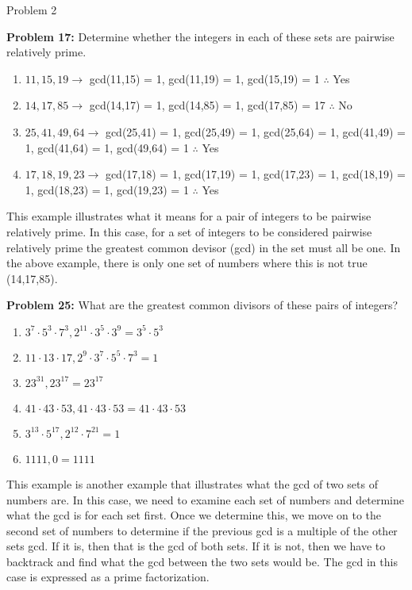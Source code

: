 \begin{problem}{Problem 2}
\begin{Highlight}[Solution]
        \noindent \textbf{Problem 17:} Determine whether the integers in each of these sets are pairwise relatively prime.

        \begin{enumerate}[label = (\alph*)]
            \item $11, 15, 19 \rightarrow$ gcd(11,15) = 1, gcd(11,19) = 1, gcd(15,19) = 1 $\therefore$ Yes
            \item $14, 17, 85 \rightarrow$ gcd(14,17) = 1, gcd(14,85) = 1, gcd(17,85) = 17 $\therefore$ No
            \item $25, 41, 49, 64 \rightarrow$ gcd(25,41) = 1, gcd(25,49) = 1, gcd(25,64) = 1, gcd(41,49) = 1, gcd(41,64) = 1, gcd(49,64) = 1 $\therefore$ Yes
            \item $17, 18, 19, 23 \rightarrow$ gcd(17,18) = 1, gcd(17,19) = 1, gcd(17,23) = 1, gcd(18,19) = 1, gcd(18,23) = 1, gcd(19,23) = 1 $\therefore$ Yes
        \end{enumerate}
        This example illustrates what it means for a pair of integers to be pairwise relatively prime. In this case, for a set of integers to be considered pairwise relatively prime the greatest 
        common devisor (gcd) in the set must all be one. In the above example, there is only one set of numbers where this is not true (14,17,85). \vspace*{1em}

        \noindent \textbf{Problem 25:} What are the greatest common divisors of these pairs of integers?

        \begin{enumerate}[label = (\alph*)]
            \item $3^{7} \cdot 5^{3} \cdot 7^{3}, 2^{11} \cdot 3^{5} \cdot 3^{9} = 3^{5} \cdot 5^{3}$
            \item $11 \cdot 13 \cdot 17, 2^{9} \cdot 3^{7} \cdot 5^{5} \cdot 7^{3} = 1$
            \item $23^{31} , 23^{17} = 23^{17}$
            \item $41 \cdot 43 \cdot 53, 41 \cdot 43 \cdot 53 = 41 \cdot 43 \cdot 53$
            \item $3^{13} \cdot 5^{17} , 2^{12} \cdot 7^{21} = 1$
            \item $1111,0 = 1111$
        \end{enumerate}
        This example is another example that illustrates what the gcd of two sets of numbers are. In this case, we need to examine each set of numbers and determine what the gcd is for each set first. 
        Once we determine this, we move on to the second set of numbers to determine if the previous gcd is a multiple of the other sets gcd. If it is, then that is the gcd of both sets. If it is not, 
        then we have to backtrack and find what the gcd between the two sets would be. The gcd in this case is expressed as a prime factorization. \vspace*{1em}


\end{Highlight}
\end{problem}
